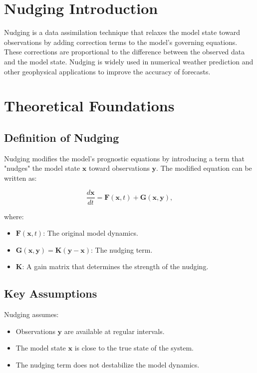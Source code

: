 \documentclass[12pt,oneside]{article}
\theoremstyle{plain}
\begin{document}
\section{Nudging Introduction}
Nudging is a data assimilation technique that relaxes the model state toward observations by adding correction terms to the model's governing equations. These corrections are proportional to the difference between the observed data and the model state. Nudging is widely used in numerical weather prediction and other geophysical applications to improve the accuracy of forecasts.

\section{Theoretical Foundations}
\subsection{Definition of Nudging}
Nudging modifies the model's prognostic equations by introducing a term that "nudges" the model state \( \mathbf{x} \) toward observations \( \mathbf{y} \). The modified equation can be written as:


\[
\frac{d\mathbf{x}}{dt} = \mathbf{F}(\mathbf{x}, t) + \mathbf{G}(\mathbf{x}, \mathbf{y}),
\]


where:
\begin{itemize}
    \item \( \mathbf{F}(\mathbf{x}, t) \): The original model dynamics.
    \item \( \mathbf{G}(\mathbf{x}, \mathbf{y}) = \mathbf{K} (\mathbf{y} - \mathbf{x}) \): The nudging term.
    \item \( \mathbf{K} \): A gain matrix that determines the strength of the nudging.
\end{itemize}

\subsection{Key Assumptions}
Nudging assumes:
\begin{itemize}
    \item Observations \( \mathbf{y} \) are available at regular intervals.
    \item The model state \( \mathbf{x} \) is close to the true state of the system.
    \item The nudging term does not destabilize the model dynamics.
\end{itemize}
\end{document}
